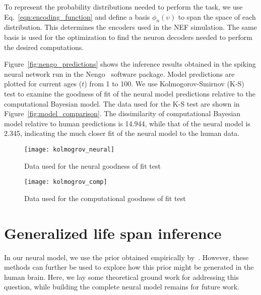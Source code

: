 \documentclass[10pt,letterpaper]{article}
\begin{document}
To represent the probability distributions needed to perform the task, we use Eq.~\ref{eqn:encoding_function} and define a basis $\phi_n(\upsilon)$ to span the space of each  distribution. This determines the encoders used in the NEF simulation. The same basis is used for the optimization to find the neuron decoders needed to perform the desired computations.  

Figure~\ref{fig:nengo_predictions} shows the inference results obtained in the spiking neural network run in the Nengo~\cite{bekolay2014nengo} software package. Model predictions are plotted for current ages ($t$) from 1 to 100.  We use Kolmogorov-Smirnov (K-S) test to examine the goodness of fit of the neural model predictions relative to the computational Bayesian model. The data used for the K-S test are shown in Figure~\ref{fig:model_comparison}. The dissimilarity of computational Bayesian model relative to human predictions is 14.944, while that of the neural model is 2.345, indicating the much closer fit of the neural model to the human data. 

\begin{figure*}
    \centering
    \begin{subfigure}{.43\textwidth}
        \texttt{[image: kolmogrov\_neural]}
        \caption{Data used for the neural goodness of fit test} 
        \label{fig:kolmogrov_neural}
    \end{subfigure}
    \begin{subfigure}{.43\textwidth}
        \texttt{[image: kolmogrov\_comp]}
        \caption{Data used for the computational goodness of fit test} 
        \label{fig:kolmogrov_comp}
    \end{subfigure}
    \caption{
        Kolmogorov-Smirnov (K-S) test results. The dissimilarity of computational model (i.e., the
Bayesian model from~) relative to human predictions is 14.944, while that of the neural model is 2.345.
    }\label{fig:model_comparison}
\end{figure*}


\section{Generalized life span inference}

In our neural model, we use the prior obtained empirically by~. However, these methods can further be used to explore how this prior might be generated in the human brain. Here, we lay some theoretical ground work for addressing this question, while building the complete neural model remains for future work.
\end{document}
